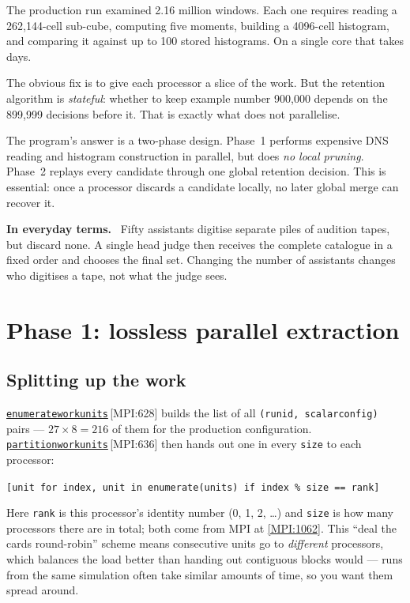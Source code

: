 \documentclass[11pt,a4paper]{report}
\newcommand{\srcbase}{vscode://file/Users/syellapa/Documents/Research/2026/ANSYS/Multi-ScalarPDF}
\newcommand{\srctag}[1]{{\footnotesize\textcolor{TagGray}{[#1]}}}
\newcommand{\Mpi}[2]{\href{\srcbase/EnsightPDFHybridDatasetMPI.py:#1}{\texttt{#2}}\,\srctag{MPI:#1}}
\newcommand{\MpiL}[1]{\href{\srcbase/EnsightPDFHybridDatasetMPI.py:#1}{\srctag{MPI:#1}}}
\newcommand{\code}[1]{\texttt{#1}}
\renewcommand{\_}{\origtextunderscore\allowbreak}
\newlength{\calloutwidth}
\newcommand{\calloutOpen}{%
  \par\medskip\noindent
  \setlength{\calloutwidth}{\dimexpr\linewidth-2\fboxsep\relax}%
  \begin{lrbox}{\calloutbox}\begin{minipage}{\calloutwidth}}
\newcommand{\calloutClose}[1]{%
  \end{minipage}\end{lrbox}\colorbox{#1}{\usebox{\calloutbox}}\par\medskip}
\newenvironment{analogy}
  {\calloutOpen\textbf{In everyday terms.}\ }
  {\calloutClose{BoxBG}}
\begin{document}
The production run examined 2.16 million windows. Each one requires reading a 262{,}144-cell
sub-cube, computing five moments, building a 4096-cell histogram, and comparing it against up
to 100 stored histograms. On a single core that takes days.

The obvious fix is to give each processor a slice of the work. But the retention algorithm is
\emph{stateful}: whether to keep example number 900{,}000 depends on the 899{,}999 decisions
before it. That is exactly what does not parallelise.

The program's answer is a two-phase design. Phase~1 performs expensive DNS reading and
histogram construction in parallel, but does \emph{no local pruning}. Phase~2 replays every
candidate through one global retention decision. This is essential: once a processor discards
a candidate locally, no later global merge can recover it.

\begin{analogy}
Fifty assistants digitise separate piles of audition tapes, but discard none. A single head
judge then receives the complete catalogue in a fixed order and chooses the final set. Changing
the number of assistants changes who digitises a tape, not what the judge sees.
\end{analogy}

\section{Phase 1: lossless parallel extraction}

\subsection*{Splitting up the work}

\Mpi{628}{enumerate\_work\_units} builds the list of all
\code{(run\_id, scalar\_config)} pairs --- $27 \times 8 = 216$ of them for the production
configuration. \Mpi{636}{partition\_work\_units} then hands out one in every \code{size} to
each processor:

\begin{center}
\code{[unit for index, unit in enumerate(units) if index \% size == rank]}
\end{center}

Here \code{rank} is this processor's identity number (0, 1, 2, \dots) and \code{size} is how
many processors there are in total; both come from MPI at \MpiL{1062}. This ``deal the cards
round-robin'' scheme means consecutive units go to \emph{different} processors, which balances
the load better than handing out contiguous blocks would --- runs from the same simulation
often take similar amounts of time, so you want them spread around.
\end{document}
